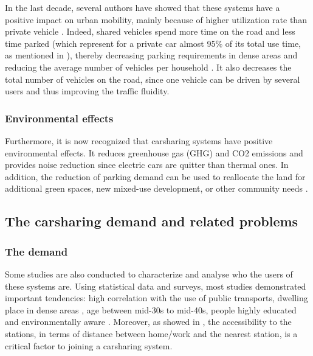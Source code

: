 \begin{bibunit}[ieeetr]
In the last decade, several authors have showed that these systems have a positive impact on urban mobility, mainly because of higher utilization rate than private vehicle \cite{litman_evaluating_2000, schuster_assessing_2005}.
Indeed, shared vehicles spend more time on the road and less time parked (which represent for a private car almost 95\% of its total use time, as mentioned in \cite{transflash_2013}), thereby decreasing parking requirements in dense areas \cite{mitchell_reinventing_2010} and reducing the average number of vehicles per household \cite{martin_impact_2010, ter_schure_cumulative_2012}.
It also decreases the total number of vehicles on the road, since one vehicle can be driven by several users and thus improving the traffic fluidity.

\subsubsection{Environmental effects}
Furthermore, it is now recognized that carsharing systems have positive environmental effects.
It reduces greenhouse gas (GHG) and CO2 emissions \cite{martin_greenhouse_2011, firnkorn_what_2011} and provides noise reduction since electric cars are quitter than thermal ones.
In addition, the reduction of parking demand can be used to reallocate the land for additional green spaces, new mixed-use development, or other community needs \cite{cohen_carsharing_2008}.




\subsection{The carsharing demand and related problems}

\subsubsection{The demand}
Some studies are also conducted to characterize and analyse who the users of these systems are.
Using statistical data and surveys, most studies demonstrated important tendencies: high correlation with the use of public transports, dwelling place in dense areas \cite{cervero_city_2003, millard_ball_car_sharing_2005, burkhardt_who_2006}, age between mid-30s to mid-40s, people highly educated and environmentally aware \cite{costain_synopsis_2012, efthymiou_which_2012, millard_ball_car_sharing_2005, brook_carsharingstart_2004, lane_phillycarshare_2005, zheng_carsharing_2009}.
Moreover, as showed in \cite{costain_synopsis_2012, efthymiou_which_2012, zheng_carsharing_2009}, the accessibility to the stations, in terms of distance between home/work and the nearest station, is a critical factor to joining a carsharing system.


\end{bibunit}
